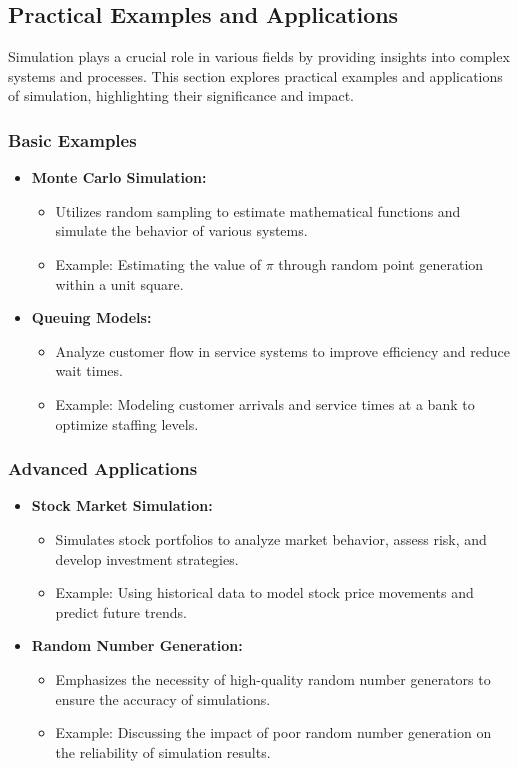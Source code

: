 
\subsection{Practical Examples and Applications}

Simulation plays a crucial role in various fields by providing insights into complex systems and processes. This section explores practical examples and applications of simulation, highlighting their significance and impact.

\subsubsection{Basic Examples}
\begin{itemize}
    \item \textbf{Monte Carlo Simulation:} 
    \begin{itemize}
        \item Utilizes random sampling to estimate mathematical functions and simulate the behavior of various systems.
        \item Example: Estimating the value of $\pi$ through random point generation within a unit square.
    \end{itemize}
    
    \item \textbf{Queuing Models:} 
    \begin{itemize}
        \item Analyze customer flow in service systems to improve efficiency and reduce wait times.
        \item Example: Modeling customer arrivals and service times at a bank to optimize staffing levels.
    \end{itemize}
\end{itemize}

\subsubsection{Advanced Applications}
\begin{itemize}
    \item \textbf{Stock Market Simulation:} 
    \begin{itemize}
        \item Simulates stock portfolios to analyze market behavior, assess risk, and develop investment strategies.
        \item Example: Using historical data to model stock price movements and predict future trends.
    \end{itemize}
    
    \item \textbf{Random Number Generation:} 
    \begin{itemize}
        \item Emphasizes the necessity of high-quality random number generators to ensure the accuracy of simulations.
        \item Example: Discussing the impact of poor random number generation on the reliability of simulation results.
    \end{itemize}
\end{itemize}


